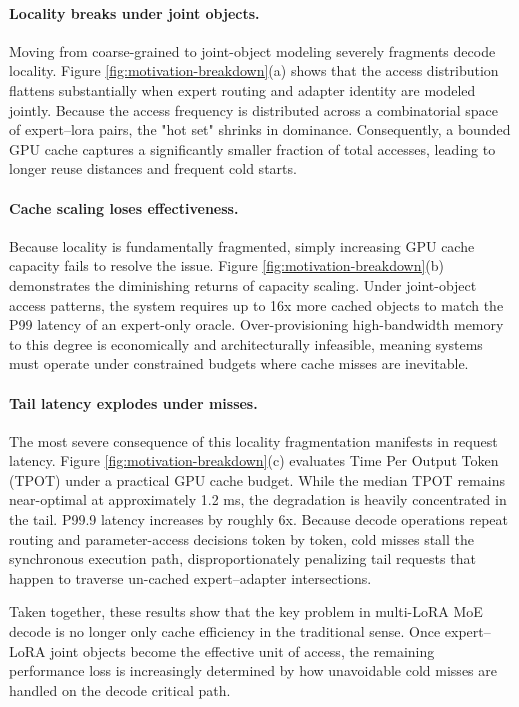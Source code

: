 \documentclass[sigplan,anonymous,review,nonacm]{acmart}
\begin{document}
\paragraph{Locality breaks under joint objects.}
Moving from coarse-grained to joint-object modeling severely fragments decode locality. Figure \ref{fig:motivation-breakdown}(a) shows that the access distribution flattens substantially when expert routing and adapter identity are modeled jointly. Because the access frequency is distributed across a combinatorial space of expert--lora pairs, the "hot set" shrinks in dominance. Consequently, a bounded GPU cache captures a significantly smaller fraction of total accesses, leading to longer reuse distances and frequent cold starts.

\paragraph{Cache scaling loses effectiveness.}
Because locality is fundamentally fragmented, simply increasing GPU cache capacity fails to resolve the issue. Figure \ref{fig:motivation-breakdown}(b) demonstrates the diminishing returns of capacity scaling. Under joint-object access patterns, the system requires up to 16x more cached objects to match the P99 latency of an expert-only oracle. Over-provisioning high-bandwidth memory to this degree is economically and architecturally infeasible, meaning systems must operate under constrained budgets where cache misses are inevitable.

\paragraph{Tail latency explodes under misses.}
The most severe consequence of this locality fragmentation manifests in request latency. Figure \ref{fig:motivation-breakdown}(c) evaluates Time Per Output Token (TPOT) under a practical GPU cache budget. While the median TPOT remains near-optimal at approximately 1.2 ms, the degradation is heavily concentrated in the tail. P99.9 latency increases by roughly 6x. Because decode operations repeat routing and parameter-access decisions token by token, cold misses stall the synchronous execution path, disproportionately penalizing tail requests that happen to traverse un-cached expert–adapter intersections.

Taken together, these results show that the key problem in multi-LoRA MoE decode is no longer only cache efficiency in the traditional sense. Once expert--LoRA joint objects become the effective unit of access, the remaining performance loss is increasingly determined by how unavoidable cold misses are handled on the decode critical path.
\end{document}
